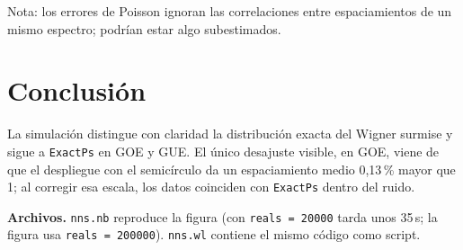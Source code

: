 \documentclass[10pt]{article}
\begin{document}
Nota: los errores de Poisson ignoran las correlaciones entre espaciamientos
de un mismo espectro; podrían estar algo subestimados.

\section{Conclusión}

La simulación distingue con claridad la distribución exacta del Wigner surmise
y sigue a \texttt{ExactPs} en GOE y GUE. El único desajuste visible, en GOE,
viene de que el despliegue con el semicírculo da un espaciamiento medio
0,13\,\% mayor que 1; al corregir esa escala, los datos coinciden con
\texttt{ExactPs} dentro del ruido.

\textbf{Archivos.} \texttt{nns.nb} reproduce la figura (con
\texttt{reals = 20000} tarda unos 35\,s; la figura usa \texttt{reals =
200000}). \texttt{nns.wl} contiene el mismo código como script.
\end{document}
